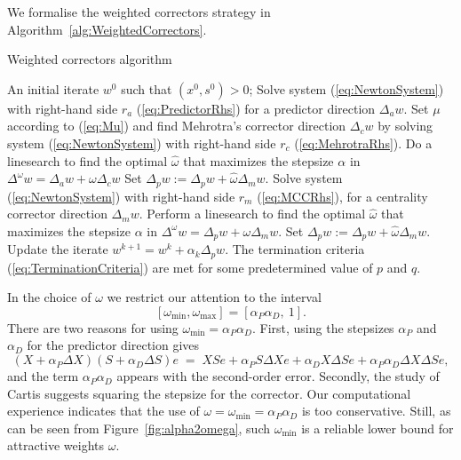 We formalise the weighted correctors strategy in 
Algorithm~\ref{alg:WeightedCorrectors}.

\begin{algorithm}[ht]
  \caption{Weighted correctors algorithm}
    \begin{algorithmic}[0]  \label{alg:WeightedCorrectors}
      \REQUIRE An initial iterate $w^0$ such that $(x^0, s^0) > 0$;
      \smallskip
      \REPEAT
        \STATE Solve system (\ref{eq:NewtonSystem}) with right-hand side $r_a$
	       (\ref{eq:PredictorRhs}) for a predictor direction $\Delta_a w$.
        \smallskip
        \STATE Set $\mu$ according to (\ref{eq:Mu}) and find Mehrotra's
               corrector direction $\Delta_c w$ by solving system
               (\ref{eq:NewtonSystem}) with right-hand side $r_c$
               (\ref{eq:MehrotraRhs}).
        \smallskip
        \STATE Do a linesearch to find the optimal $\hat\omega$ that
               maximizes the stepsize $\alpha$ in
               $\Delta^\omega w = \Delta_a w +\omega\Delta_c w$
        \smallskip
	\STATE Set $\Delta_p w := \Delta_p w +\hat\omega\Delta_m w$. 
        \smallskip
           \smallskip
           \STATE Solve system (\ref{eq:NewtonSystem}) with right-hand side
                  $r_m$ (\ref{eq:MCCRhs}), for a centrality
                 corrector direction $\Delta_m w$.
           \smallskip
	   \STATE Perform a linesearch to find the optimal $\hat\omega$ that
                  maximizes the stepsize $\alpha$ in
                  $\Delta^\omega w = \Delta_p w +\omega\Delta_m w$.
           \smallskip
           \STATE Set $\Delta_p w := \Delta_p w +\hat\omega\Delta_m w$.
           \smallskip
        \ENDWHILE
        \STATE Update the iterate $w^{k+1} = w^k + \alpha_k\Delta_p w$.
        \smallskip
      \UNTIL The termination criteria (\ref{eq:TerminationCriteria}) are met
             for some predetermined value of $p$ and $q$.
  \end{algorithmic}
\end{algorithm}

In the choice of $\omega$ we restrict our attention to
the interval 
\[
  [\omega_{\min},\omega_{\max}]=[\alpha_P\alpha_D,\ 1]. 
\]
There are two reasons for using  $\omega_{\min} = \alpha_P\alpha_D$. 
First, using the stepsizes $\alpha_P$ and $\alpha_D$ for the predictor
direction gives 
\[
(X + \alpha_P \Delta X) (S + \alpha_D \Delta S) e 
\;=\; XSe + \alpha_P S\Delta Xe + \alpha_D X\Delta Se 
          + \alpha_P\alpha_D \Delta X\Delta S e,
\]
and the term $\alpha_P\alpha_D$ appears with the second-order error. 
Secondly, the study of Cartis \cite{Cartis04} suggests squaring 
the stepsize for the corrector. Our computational experience indicates 
that the use of $\omega = \omega_{\min} = \alpha_P\alpha_D$
is too conservative. 
Still, as can be seen from Figure~\ref{fig:alpha2omega},
such $\omega_{\min}$ is a reliable lower 
bound for attractive weights $\omega$. 

